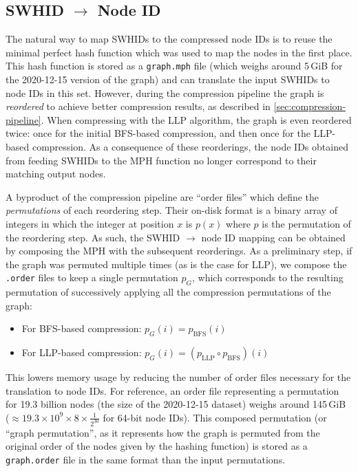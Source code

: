 \subsection{SWHID $\to$ Node ID}%
\label{sec:swhid2node}

The natural way to map \glspl{SWHID} to the compressed node IDs is to reuse the
minimal perfect hash function which was used to map the nodes in the first
place.
This hash function is stored as a \texttt{graph.mph} file (which weighs
around 5\,GiB for the 2020-12-15 version of the graph) and can translate the
input \glspl{SWHID} to node IDs in this set. However, during the compression
pipeline the graph is \emph{reordered} to achieve better compression results,
as described in \cref{sec:compression-pipeline}. When compressing with the
\gls{LLP} algorithm, the graph is even reordered twice: once for the initial
BFS-based compression, and then once for the LLP-based compression. As a
consequence of these reorderings, the node IDs obtained from feeding
\glspl{SWHID} to the \gls{MPH} function no longer correspond to their matching
output nodes.

A byproduct of the compression pipeline are ``order files'' which define
the \emph{permutations} of each reordering step. Their on-disk format is a
binary array of integers in which the integer at position $x$ is $p(x)$ where
$p$ is the permutation of the reordering step. As such, the \gls{SWHID} $\to$
node ID mapping can be obtained by composing the \gls{MPH} with the subsequent
reorderings. As a preliminary step, if the graph was permuted multiple times
(as is the case for \gls{LLP}), we compose the \texttt{.order} files to keep a
single permutation $p_G$, which corresponds to the resulting permutation of
successively applying all the compression permutations of the graph:

\begin{itemize}
    \item For BFS-based compression: $p_G(i) = p_{\mathrm{BFS}}(i)$
    \item For LLP-based compression:
        $p_G(i) = (p_{\mathrm{LLP}} \circ p_{\mathrm{BFS}})(i)$
\end{itemize}

This lowers memory usage by reducing the number of order files necessary for
the translation to node IDs. For reference, an order file representing a
permutation for 19.3 billion nodes (the size of the 2020-12-15 dataset) weighs
around 145\,GiB ($\approx 19.3 \times 10^9 \times 8 \times \frac{1}{2^{30}}$
for 64-bit node IDs).
This composed permutation (or ``graph permutation'', as it represents how the
graph is permuted from the original order of the nodes given by the hashing
function) is stored as a \texttt{graph.order} file in the same format than the
input permutations.

